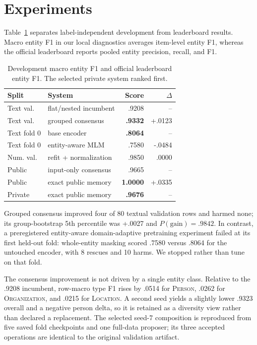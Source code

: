 \documentclass[11pt]{article}
\begin{document}
\section{Experiments}
Table~\ref{tab:results} separates label-independent development from leaderboard results. Macro entity F1 in our local diagnostics averages item-level entity F1, whereas the official leaderboard reports pooled entity precision, recall, and F1.

\begin{table}[t]
\centering
\small
\setlength{\tabcolsep}{3.5pt}
\begin{tabular}{@{}llrr@{}}
\toprule
Split & System & Score & $\Delta$ \\
\midrule
Text val. & flat/nested incumbent & .9208 & -- \\
Text val. & grouped consensus & \textbf{.9332} & +.0123 \\
Text fold 0 & base encoder & \textbf{.8064} & -- \\
Text fold 0 & entity-aware MLM & .7580 & -.0484 \\
Num. val. & refit + normalization & .9850 & .0000 \\
Public & input-only consensus & .9665 & -- \\
Public & exact public memory & \textbf{1.0000} & +.0335 \\
Private & exact public memory & \textbf{.9676} & -- \\
\bottomrule
\end{tabular}
\caption{Development macro entity F1 and official leaderboard entity F1. The selected private system ranked first.}
\label{tab:results}
\end{table}

Grouped consensus improved four of 80 textual validation rows and harmed none; its group-bootstrap 5th percentile was +.0027 and $P(\mathrm{gain})=.9842$. In contrast, a preregistered entity-aware domain-adaptive pretraining experiment \citep{gururangan-etal-2020-dont} failed at its first held-out fold: whole-entity masking scored .7580 versus .8064 for the untouched encoder, with 8 rescues and 10 harms. We stopped rather than tune on that fold.

The consensus improvement is not driven by a single entity class.  Relative
to the .9208 incumbent, row-macro type F1 rises by .0514 for
\textsc{Person}, .0262 for \textsc{Organization}, and .0215 for
\textsc{Location}.  A second seed yields a slightly lower .9323 overall and a
negative person delta, so it is retained as a diversity view rather than
declared a replacement.  The selected seed-7 composition is reproduced from
five saved fold checkpoints and one full-data proposer; its three accepted
operations are identical to the original validation artifact.
\end{document}

